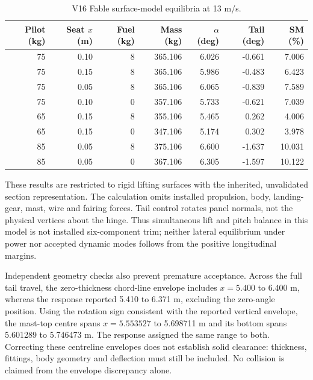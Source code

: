 \documentclass[11pt,a4paper]{article}
\begin{document}
\begin{table}[htbp]
\centering\small
\caption{V16 Fable surface-model equilibria at 13 m/s.}
\label{tab:v16_cases}
\begin{tabular}{rrrrrrr}
\hline
Pilot (kg)&Seat $x$ (m)&Fuel (kg)&Mass (kg)&$\alpha$ (deg)&Tail (deg)&SM (\%)\\
\hline
75 & 0.10 & 8 & 365.106 & 6.026 & -0.661 & 7.006 \\
75 & 0.15 & 8 & 365.106 & 5.986 & -0.483 & 6.423 \\
75 & 0.05 & 8 & 365.106 & 6.065 & -0.839 & 7.589 \\
75 & 0.10 & 0 & 357.106 & 5.733 & -0.621 & 7.039 \\
65 & 0.15 & 8 & 355.106 & 5.465 & 0.262 & 4.006 \\
65 & 0.15 & 0 & 347.106 & 5.174 & 0.302 & 3.978 \\
85 & 0.05 & 8 & 375.106 & 6.600 & -1.637 & 10.031 \\
85 & 0.05 & 0 & 367.106 & 6.305 & -1.597 & 10.122 \\
\hline
\end{tabular}
\end{table}

These results are restricted to rigid lifting surfaces with the inherited,
unvalidated section representation. The calculation omits installed propulsion,
body, landing-gear, mast, wire and fairing forces. Tail control rotates panel normals,
not the physical vertices about the hinge. Thus simultaneous lift and pitch balance
in this model is not installed six-component trim; neither lateral equilibrium under
power nor accepted dynamic modes follows from the positive longitudinal margins.

Independent geometry checks also prevent premature acceptance. Across the full
tail travel, the zero-thickness chord-line envelope includes $x=5.400$ to 6.400 m,
whereas the response reported 5.410 to 6.371 m, excluding the zero-angle position.
Using the rotation sign consistent with the reported vertical envelope, the mast-top
centre spans $x=5.553527$ to 5.698711 m and its bottom spans 5.601289 to 5.746473 m.
The response assigned the same range to both. Correcting these centreline envelopes
does not establish solid clearance: thickness, fittings, body geometry and deflection
must still be included. No collision is claimed from the envelope discrepancy alone.
\end{document}
